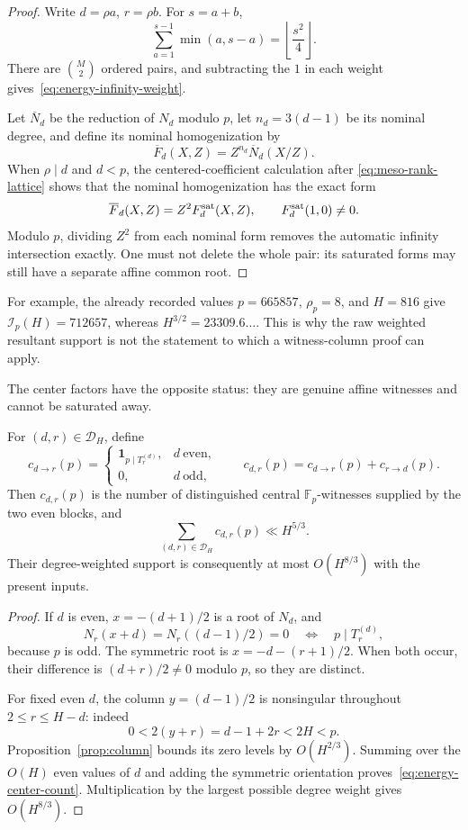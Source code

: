 \begin{proof}
Write $d=\rho a$, $r=\rho b$.  For $s=a+b$,
\[
 \sum_{a=1}^{s-1}\min(a,s-a)=\left\lfloor\frac{s^2}{4}\right\rfloor.
\]
There are $\binom M2$ ordered pairs, and subtracting the $1$ in each
weight gives~\eqref{eq:energy-infinity-weight}.

Let $\overline N_d$ be the reduction of $N_d$ modulo $p$, let
$n_d=3(d-1)$ be its nominal degree, and define its nominal
homogenization by
\[
 \overline F_d(X,Z)=Z^{n_d}\overline N_d(X/Z).
\]
When $\rho\mid d$ and $d<p$, the centered-coefficient calculation after
\eqref{eq:meso-rank-lattice} shows that the nominal homogenization has
the exact form
\[
 \overline F_d(X,Z)=Z^2F_d^{\rm sat}(X,Z),
 \qquad F_d^{\rm sat}(1,0)\ne0.
\]
Modulo $p$, dividing $Z^2$ from each nominal form removes the automatic
infinity intersection exactly.  One must not delete the whole pair: its
saturated forms may still have a separate affine common root.
\end{proof}

For example, the already recorded values $p=665857$, $\rho_p=8$, and
$H=816$ give $\mathcal I_p(H)=712657$, whereas
$H^{3/2}=23309.6\ldots$.  This is why the raw weighted resultant support
is not the statement to which a witness-column proof can apply.

The center factors have the opposite status: they are genuine affine
witnesses and cannot be saturated away.

\begin{proposition}
\label{prop:energy-center-witnesses}
For $(d,r)\in\mathscr D_H$, define
\[
 c_{d\to r}(p)=
 \begin{cases}
  \mathbf1_{p\mid T_r^{(d)}},&d\ \text{even},\\
  0,&d\ \text{odd},
 \end{cases}
 \qquad
 c_{d,r}(p)=c_{d\to r}(p)+c_{r\to d}(p).
\]
Then $c_{d,r}(p)$ is the number of distinguished central
$\mathbb F_p$-witnesses supplied by the two even blocks, and
\begin{equation}\label{eq:energy-center-count}
 \sum_{(d,r)\in\mathscr D_H}c_{d,r}(p)\ll H^{5/3}.
\end{equation}
Their degree-weighted support is consequently at most $O(H^{8/3})$ with
the present inputs.
\end{proposition}

\begin{proof}
If $d$ is even, $x=-(d+1)/2$ is a root of $N_d$, and
\[
 N_r(x+d)=N_r((d-1)/2)=0
 \quad\Longleftrightarrow\quad p\mid T_r^{(d)},
\]
because $p$ is odd.  The symmetric root is
$x=-d-(r+1)/2$.  When both occur, their difference is $(d+r)/2\ne0$
modulo $p$, so they are distinct.

For fixed even $d$, the column $y=(d-1)/2$ is nonsingular throughout
$2\leq r\leq H-d$: indeed
\[
 0<2(y+r)=d-1+2r<2H<p.
\]
Proposition~\ref{prop:column} bounds its zero levels by $O(H^{2/3})$.
Summing over the $O(H)$ even values of $d$ and adding the symmetric
orientation proves~\eqref{eq:energy-center-count}.  Multiplication by
the largest possible degree weight gives $O(H^{8/3})$.
\end{proof}

